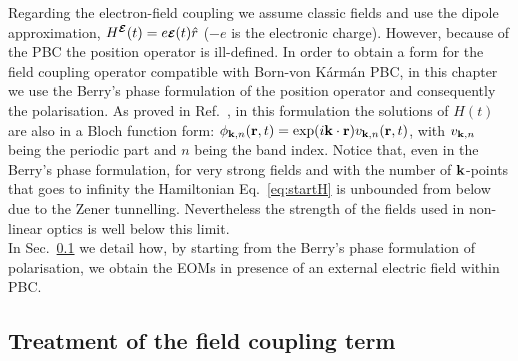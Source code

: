 Regarding the electron-field coupling we assume classic fields and use the dipole approximation, $H^{\boldsymbol{\scriptstyle \cal E}}(t)=e\boldsymbol{\scriptstyle \cal E}(t)\hat r$ ($-e$ is the electronic charge).  However, because of the PBC the position operator is ill-defined. In order to obtain a form for the field coupling operator compatible with  Born-von K\'arm\'an PBC, in this chapter we use the Berry's phase formulation of the position operator and  consequently the polarisation. As proved in Ref.~\cite{souza_prb}, in this formulation the solutions of  $H(t)$ are also in a Bloch function form: $\phi_{{\bf k},n}({\bf r},t) = \mathrm{exp}(i{\bf k}\cdot{\bf r}) v_{{\bf k},n} ({\bf r},t)$, with  $v_{{\bf k},n}$ being the periodic part and $n$ being the band index. Notice that, even in the Berry's phase formulation, for very strong fields and with the number of ${\bf k}$-points that goes to infinity the Hamiltonian Eq.~\ref{eq:startH} is unbounded from below due to the Zener tunnelling.\cite{springborg} Nevertheless the strength of the fields used in non-linear optics is well below this limit.\cite{springborg,souza_prb}\\
In Sec.~\ref{ss:fldcpl} we detail how, by starting from the Berry's phase formulation of polarisation, we  obtain the EOMs in presence of an external electric field within PBC.                 
\subsection{Treatment of the field coupling term}\label{ss:fldcpl}
